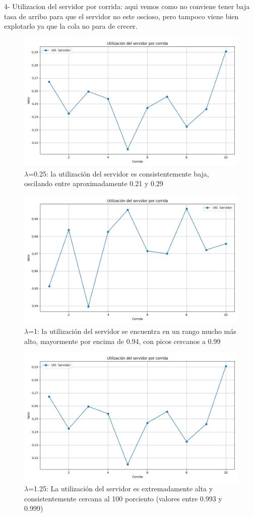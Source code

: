 \documentclass{article}
\begin{document}
4- Utilizacion del servidor por corrida: aqui vemos como no conviene tener baja tasa de arribo para que el servidor no este oscioso, pero tampoco viene bien explotarlo ya que la cola no para de crecer. 
\begin{figure}
    \centering
    \includegraphics[width=0.5\linewidth]{Imagenes/MM1/util_sv_0.25_infinita.png}
    \caption{\( \lambda \)=0.25: la utilización del servidor es consistentemente baja, oscilando entre aproximadamente 0.21 y 0.29}
    \label{fig:enter-label}
\end{figure}
\begin{figure}
    \centering
    \includegraphics[width=0.5\linewidth]{Imagenes/MM1/util_sv_1.0_infinita.png}
    \caption{\( \lambda \)=1: la utilización del servidor se encuentra en un rango mucho más alto, mayormente por encima de 0.94, con picos cercanos a 0.99}
    \label{fig:enter-label}
\end{figure}
\begin{figure}
    \centering
    \includegraphics[width=0.5\linewidth]{Imagenes/MM1/util_sv_0.25_infinita.png}
    \caption{\( \lambda \)=1.25: La utilización del servidor es extremadamente alta y consistentemente cercana al 100 porciento (valores entre 0.993 y 0.999)}
    \label{fig:enter-label}
\end{figure}
\FloatBarrier
\end{document}
